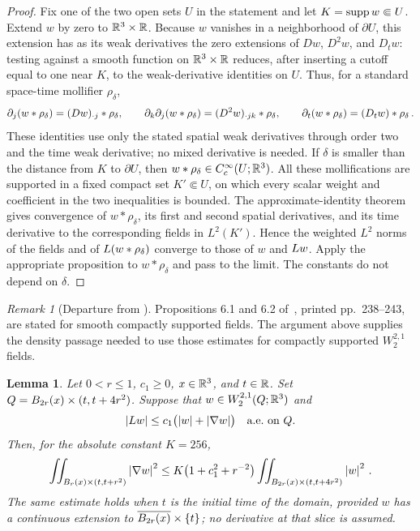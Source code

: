 \documentclass[11pt,letterpaper]{article}
\numberwithin{equation}{section}
\theoremstyle{plain}
\newtheorem{lemma}[theorem]{Lemma}
\theoremstyle{definition}
\theoremstyle{remark}
\newtheorem{remark}[theorem]{Remark}
\begin{document}
\begin{proof}
Fix one of the two open sets $U$ in the statement and let $K=\operatorname{supp} w\Subset U$. Extend $w$ by zero to $\mathbb{R}^3\times\mathbb{R}$. Because $w$ vanishes in a neighborhood of $\partial U$, this extension has as its weak derivatives the zero extensions of $Dw$, $D^2w$, and $D_tw$: testing against a smooth function on $\mathbb{R}^3\times\mathbb{R}$ reduces, after inserting a cutoff equal to one near $K$, to the weak-derivative identities on $U$. Thus, for a standard space-time mollifier $\rho_\delta$,
\[
\partial_j(w*\rho_\delta)=(Dw)_{\cdot j}*\rho_\delta,\qquad
\partial_k\partial_j(w*\rho_\delta)=(D^2w)_{\cdot jk}*\rho_\delta,\qquad
\partial_t(w*\rho_\delta)=(D_tw)*\rho_\delta\,.
\]
These identities use only the stated spatial weak derivatives through order two and the time weak derivative; no mixed derivative is needed. If $\delta$ is smaller than the distance from $K$ to $\partial U$, then $w*\rho_\delta\in C_c^\infty(U;\mathbb{R}^3)$. All these mollifications are supported in a fixed compact set $K'\Subset U$, on which every scalar weight and coefficient in the two inequalities is bounded. The approximate-identity theorem gives convergence of $w*\rho_\delta$, its first and second spatial derivatives, and its time derivative to the corresponding fields in $L^2(K')$. Hence the weighted $L^2$ norms of the fields and of $L(w*\rho_\delta)$ converge to those of $w$ and $L w$. Apply the appropriate proposition to $w*\rho_\delta$ and pass to the limit. The constants do not depend on $\delta$.
\end{proof}

\begin{remark}[Departure from \cite{ESS2003}]
Propositions 6.1 and 6.2 of~\cite{ESS2003}, printed pp.~238--243, are stated for smooth compactly supported fields. The argument above supplies the density passage needed to use those estimates for compactly supported $W^{2,1}_2$ fields.
\end{remark}

\begin{lemma}\label{lem:caccioppoli}
Let $0<r\le1$, $c_1\ge0$, $x\in\mathbb{R}^3$, and $t\in\mathbb{R}$. Set $Q=B_{2r}(x)\times(t,t+4r^2)$. Suppose that $w\in W^{2,1}_2(Q;\mathbb{R}^3)$ and
\[
\left\lvert L w\right\rvert\le c_1\bigl(\left\lvert w\right\rvert+\left\lvert \nabla w\right\rvert\bigr)\quad\text{a.e.\ on }Q.
\]
Then, for the absolute constant $K=256$,
\[
\iint_{B_{r}(x)\times(t,t+r^2)}\left\lvert \nabla w\right\rvert^2
\le K\bigl(1+c_1^2+r^{-2}\bigr)
\iint_{B_{2r}(x)\times(t,t+4r^2)}\left\lvert w\right\rvert^2\,.
\]
The same estimate holds when $t$ is the initial time of the domain, provided $w$ has a continuous extension to $\overline{B_{2r}(x)}\times\{t\}$; no derivative at that slice is assumed.
\end{lemma}
\end{document}
